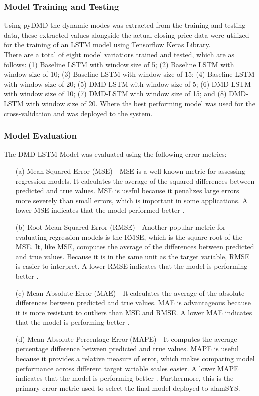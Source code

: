 \subsubsection{Model Training and Testing}
\label{subsubsec:model_training_testing}
Using pyDMD the dynamic modes was extracted from the training and testing data,
these extracted values alongside the actual closing price data were utilized for
the training of an LSTM model using Tensorflow Keras Library.
\hfill \\

There are a total of eight model variations trained and tested, which are as follows:
(1) Baseline LSTM with window size of 5;
(2) Baseline LSTM with window size of 10;
(3) Baseline LSTM with window size of 15;
(4) Baseline LSTM with window size of 20;
(5) DMD-LSTM with window size of 5;
(6) DMD-LSTM with window size of 10;
(7) DMD-LSTM with window size of 15; and
(8) DMD-LSTM with window size of 20.
Where the best performing model was used for the cross-validation and was deployed to the system.


\subsubsection{Model Evaluation}
\label{subsubsec:model_evaluation}
The DMD-LSTM Model was evaluated using the following error metrics:
\begin{itemize}
    \item[(a)] Mean Squared Error (MSE) - MSE is a well-known metric for assessing regression models. 
    It calculates the average of the squared differences between predicted and true values. 
    MSE is useful because it penalizes large errors more severely than small errors, 
    which is important in some applications. A lower MSE indicates that the model performed better
    \cite{StephMSE}.
    \item[(b)] Root Mean Squared Error (RMSE) - Another popular metric for evaluating regression models 
    is the RMSE, which is the square root of the MSE. It, like MSE, computes the average of the 
    differences between predicted and true values. Because it is in the same unit as the target variable, 
    RMSE is easier to interpret. A lower RMSE indicates that the model is performing better
    \cite{StephRMSE}.
    \item[(c)] Mean Absolute Error (MAE) - It calculates the average of the absolute differences 
    between predicted and true values. MAE is advantageous because it is more resistant to 
    outliers than MSE and RMSE. A lower MAE indicates that the model is performing better
    \cite{SecretDataScientistMAE}.
    \item[(d)] Mean Absolute Percentage Error (MAPE) - It computes the average percentage difference 
    between predicted and true values. MAPE is useful because it provides a relative measure of error, 
    which makes comparing model performance across different target variable scales easier. 
    A lower MAPE indicates that the model is performing better
    \cite{Allwright2022MAPE}.
    Furthermore, this is the primary error metric used to select the final model deployed to alamSYS.
\end{itemize}

